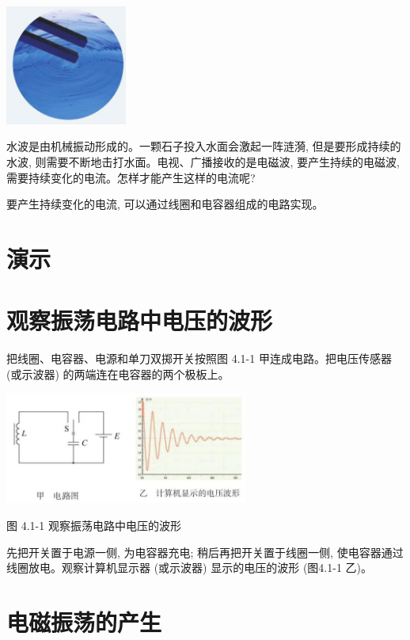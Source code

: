 \documentclass[10pt]{article}
\begin{document}
\begin{center}
\includegraphics[max width=0.3\textwidth]{images/01910e72-c5b7-7ed5-a6d4-fb3a5faefc32_76_292908.jpg}
\end{center}

水波是由机械振动形成的。一颗石子投入水面会激起一阵涟漪, 但是要形成持续的水波, 则需要不断地击打水面。电视、广播接收的是电磁波, 要产生持续的电磁波, 需要持续变化的电流。怎样才能产生这样的电流呢?

要产生持续变化的电流, 可以通过线圈和电容器组成的电路实现。

\section*{演示}

\section*{观察振荡电路中电压的波形}

把线圈、电容器、电源和单刀双掷开关按照图 4.1-1 甲连成电路。把电压传感器 (或示波器) 的两端连在电容器的两个极板上。

\begin{center}
\includegraphics[max width=0.6\textwidth]{images/01910e72-c5b7-7ed5-a6d4-fb3a5faefc32_76_421066.jpg}
\end{center}

图 4.1-1 观察振荡电路中电压的波形

先把开关置于电源一侧, 为电容器充电; 稍后再把开关置于线圈一侧, 使电容器通过线圈放电。观察计算机显示器 (或示波器) 显示的电压的波形 (图4.1-1 乙)。

\section*{电磁振荡的产生}
\end{document}
